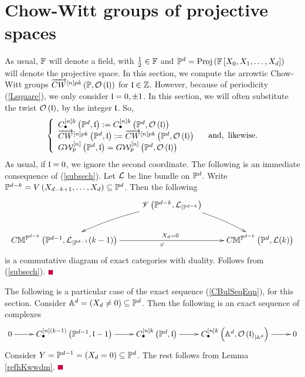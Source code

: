 \documentclass[12pt]{article}
\begin{document}
\section{Chow-Witt groups of projective spaces}\label{SecPdDesc}
As usual, ${\BF}$ will denote a field, with $\frac{1}{2}\in {\BF}$ and ${\BP}^d=\proj{{\BF}\LRt{X_0, X_1, 
\ldots, X_d}}$ will denote the projective space. In this section, we compute the arrowtic Chow-Witt groups
$\ora{CW}^{\LRt{n}pk}\LRf{{\BP}, {\CO}\LRf{\l}}$ for $\l\in {\BZ}$. However, because of periodicity (\ref{Lsquare}), we only  consider $\l=0, \pm 1$.  
In this section, we will often substitute the twist ${\CO}\LRf{\l}$, by the integer $\l$. So, 
  $$
  \LBrace{{l}
  C^{\LRt{n}k}_{\bul}\LRf{{\BP}^d, \l}:= C^{\LRt{n}k}_{\bul}\LRf{{\BP}^d, {\CO}\LRf{\l}}\\
  \ora{CW}^{\LRt{n}pk}\LRf{{\BP}^d, \l}:= \ora{CW}^{\LRt{n}pk}\LRf{{\BP}^d, {\CO}\LRf{\l}} \\
  G{\CW}^{\LRt{n}}_p\LRf{{\BP}^d, \l}=  G{\CW}_p^{\LRt{n}}\LRf{{\BP}^d, {\CO}\LRf{\l}}\\
  }
  \quad {\rm and, ~likewise}.
  $$
As usual, if $\l=0$, we ignore the second coordinate. 
The following  is an immediate consequence of (\ref{subsech}). %
\bL\label{CorPnnn}{\rm 
Let ${\CL}$ be line bundle on ${\BP}^d$. 
Write ${\BP}^{d-k}=V\LRf{X_{d-k+1}, \ldots, X_d}\subseteq {\BP}^d$. Then the following
$$
\diagram 
&{\SV}\LRf{{\BP}^{d-k}, {\CL}_{|{\BP}^{d-k}}} \ar@/^/[dr]\ar@/_/[dl]& \\
C{\BM}^{{\BP}^{d-k}}\LRf{{\BP}^{d-1}, {\CL}_{|{\BP}^{d-1}}(k-1)}\ar[rr]^{\qquad X_d=0}_{\varphi} && C{\BM}^{{\BP}^{d-k}}\LRf{{\BP}^d, {\CL}(k)}\\
\enddiagram \\
$$ 
is a commutative diagram of exact categories with duality. 
}
\eL
\pf Follows from  (\ref{subsech}). $\eop$ %

\vspace{3mm}
The following is a particular case of the exact sequence (\ref{CBulSeqEqn}), for this section.
\bL\label{PdkoPromecx}{\rm 
Consider ${\BA}^d=\LRf{X_d\neq 0}\subseteq {\BP}^d$.
Then the following is an exact sequence of complexes
\begin{equation}\label{CPnuSeqEqn}
\diagram 
0 \ar[r] & C^{\LRt{n}(k-1)}_{\bul}\LRf{{\BP}^{d-1}, \l-1} \ar[r] & C^{\LRt{n}k}_{\bul}\LRf{{\BP}^d, \l} \ar[r] &  C^{\LRt{n}k}_{\bul}\LRf{{\BA}^{d}, {\CO}\LRf{\l}_{|{\BA}^{d}}} \ar[r] & 0\\
\enddiagram
\end{equation}
}
\eL
\pf Consider $Y={\BP}^{d-1}=\LRf{X_d=0}\subseteq {\BP}^d$. The rest follows from Lemma \ref{refhKwwdm}. 
$\eop$ 
\end{document}
